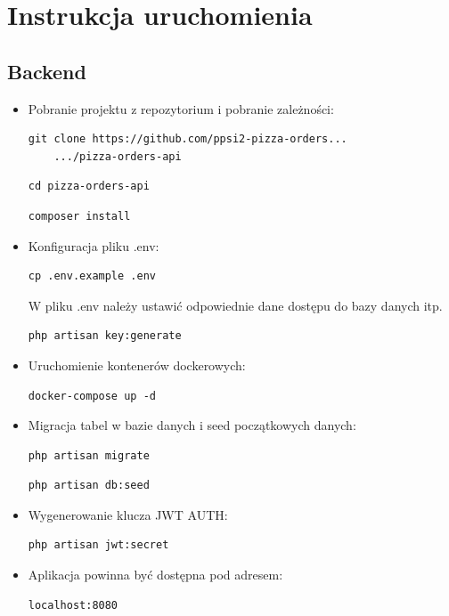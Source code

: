 \documentclass[12pt]{article}
\begin{document}
\clearpage

\section{Instrukcja uruchomienia}
\vspace{1cm}
\subsection{Backend}

\begin{itemize}
	\item Pobranie projektu z repozytorium i pobranie zależności:
	\begin{lstlisting}[]
	git clone https://github.com/ppsi2-pizza-orders...
	.../pizza-orders-api
	\end{lstlisting}
	\begin{lstlisting}[]
	cd pizza-orders-api
	\end{lstlisting}
	\begin{lstlisting}[]
	composer install
	\end{lstlisting}
	\item Konfiguracja pliku .env:
	\begin{lstlisting}[]
	cp .env.example .env
	\end{lstlisting}
	W pliku .env należy ustawić odpowiednie dane dostępu do bazy danych itp.
	\begin{lstlisting}[]
	php artisan key:generate
	\end{lstlisting}
	\item Uruchomienie kontenerów dockerowych:
	\begin{lstlisting}[]
	docker-compose up -d
	\end{lstlisting}
	\item Migracja tabel w bazie danych i seed początkowych danych:
	\begin{lstlisting}[]
	php artisan migrate
	\end{lstlisting}
	\begin{lstlisting}[]
	php artisan db:seed
	\end{lstlisting}
	\item Wygenerowanie klucza JWT AUTH:
	\begin{lstlisting}[]
	php artisan jwt:secret
	\end{lstlisting}
	\item Aplikacja powinna być dostępna pod adresem:
	\begin{lstlisting}[]
	localhost:8080
	\end{lstlisting}
\end{itemize}
\end{document}

